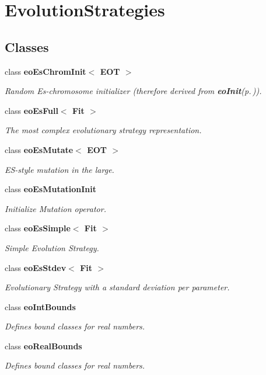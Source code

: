 \section{Evolution\-Strategies}
\label{group___evolution_strategies}
\subsection*{Classes}
\begin{CompactItemize}
\item 
class {\bf eo\-Es\-Chrom\-Init$<$ EOT $>$}
\begin{CompactList}\small\item\em Random Es-chromosome initializer (therefore derived from {\bf eo\-Init}{\rm (p.\,\pageref{classeo_init})}). \item\end{CompactList}\item 
class {\bf eo\-Es\-Full$<$ Fit $>$}
\begin{CompactList}\small\item\em The most complex evolutionary strategy representation. \item\end{CompactList}\item 
class {\bf eo\-Es\-Mutate$<$ EOT $>$}
\begin{CompactList}\small\item\em ES-style mutation in the large. \item\end{CompactList}\item 
class {\bf eo\-Es\-Mutation\-Init}
\begin{CompactList}\small\item\em Initialize Mutation operator. \item\end{CompactList}\item 
class {\bf eo\-Es\-Simple$<$ Fit $>$}
\begin{CompactList}\small\item\em Simple Evolution Strategy. \item\end{CompactList}\item 
class {\bf eo\-Es\-Stdev$<$ Fit $>$}
\begin{CompactList}\small\item\em Evolutionary Strategy with a standard deviation per parameter. \item\end{CompactList}\item 
class {\bf eo\-Int\-Bounds}
\begin{CompactList}\small\item\em Defines bound classes for real numbers. \item\end{CompactList}\item 
class {\bf eo\-Real\-Bounds}
\begin{CompactList}\small\item\em Defines bound classes for real numbers. \item\end{CompactList}\end{CompactItemize}
